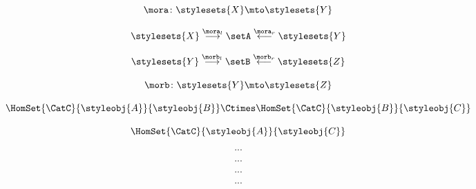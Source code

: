 \begin{forslides}
     \begin{equation}
        \label{eq:slides_multicategories_76}
       \mora \colon \stylesets{X}  \mto \stylesets{Y}
    \end{equation}
    
     \begin{equation}
        \label{eq:slides_multicategories_77}
       \stylesets{X} \overset{\mora_l}{\longrightarrow} \setA \overset{\mora_r}{\longleftarrow} \stylesets{Y} 
    \end{equation}
    
     \begin{equation}
        \label{eq:slides_multicategories_78}
      \stylesets{Y} \overset{\morb_l}{\longrightarrow} \setB \overset{\morb_r}{\longleftarrow} \stylesets{Z} 
    \end{equation}
    
    \begin{equation}
        \label{eq:slides_multicategories_79}
        \morb \colon \stylesets{Y}  \mto \stylesets{Z}
    \end{equation}
    
     \begin{equation}
        \label{eq:slides_multicategories_80}
      \HomSet{\CatC}{\styleobj{A}}{\styleobj{B}} \Ctimes \HomSet{\CatC}{\styleobj{B}}{\styleobj{C}}
    \end{equation}
    
     \begin{equation}
        \label{eq:slides_multicategories_81}
      \HomSet{\CatC}{\styleobj{A}}{\styleobj{C}}
    \end{equation}
    
    \begin{equation}
        \label{eq:slides_multicategories_82}
       ...
    \end{equation}
    
     \begin{equation}
        \label{eq:slides_multicategories_83}
     ...
    \end{equation}
    
     \begin{equation}
        \label{eq:slides_multicategories_84}
     ...
    \end{equation}
    
    \begin{equation}
        \label{eq:slides_multicategories_85}
       ...
    \end{equation}
    

\end{forslides}
